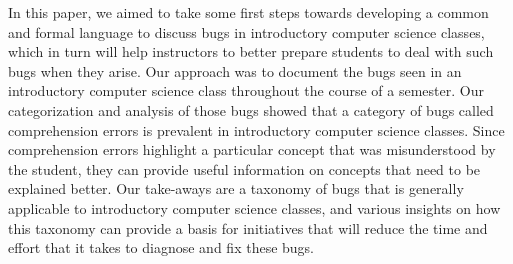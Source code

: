 \documentclass{sig-alternate}
\begin{document}
In this paper, we aimed to take some first steps towards developing a common and formal language to discuss bugs in introductory computer science classes, which in turn will help instructors to better prepare students to deal with such bugs when they arise. Our approach was to document the bugs seen in an introductory computer science class throughout the course of a semester. Our categorization and analysis of those bugs showed that a category of bugs called comprehension errors is prevalent in introductory computer science classes. Since comprehension errors highlight a particular concept that was misunderstood by the student, they can provide useful information on concepts that need to be explained better. Our take-aways are a taxonomy of bugs that is generally applicable to introductory computer science classes, and various insights on how this taxonomy can provide a basis for initiatives that will reduce the time and effort that it takes to diagnose and fix these bugs.\\



\balancecolumns
\end{document}
